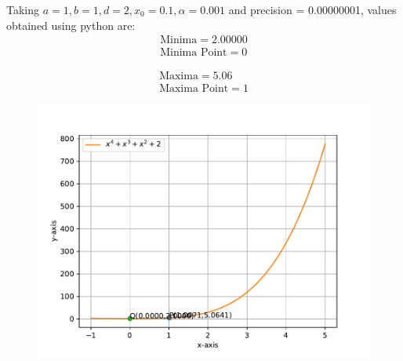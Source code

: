 \documentclass[journal,10pt,twocolumn]{article}
\numberwithin{equation}{subsection}
\begin{document}
Taking $a=1,b=1,d=2,x_0=0.1,\alpha=0.001$ and precision = 0.00000001, values obtained using python are:    
    \begin{align}
        \boxed{\text{Minima} = 2.00000}\\
        \boxed{\text{Minima Point} = 0}
    \end{align}
     
    \begin{align}
        \boxed{\text{Maxima} = 5.06}\\
        \boxed{\text{Maxima Point} = 1}
    \end{align}

\begin{figure}[t]
	\centering
	\includegraphics[width=1\columnwidth]{figs6.pdf}
\end{figure}
\end{document}
